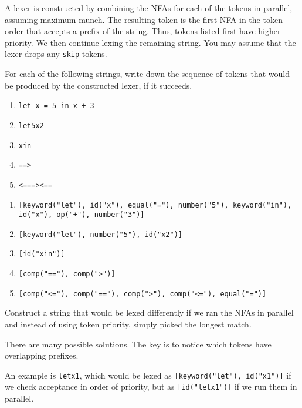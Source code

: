 A lexer is constructed by combining the NFAs for each of the tokens in parallel,
assuming maximum munch. The resulting token is the first NFA in the token order
that accepts a prefix of the string. Thus, tokens listed first have higher
priority. We then continue lexing the remaining string. You may assume that the
lexer drops any \texttt{skip} tokens.

\begin{exercise}{}

  For each of the following strings, write down the sequence of tokens that
  would be produced by the constructed lexer, if it succeeds. 

  \begin{enumerate}
    \item \texttt{let x = 5 in x + 3}
    \item \texttt{let5x2}
    \item \texttt{xin}
    \item \texttt{==>}
    \item \texttt{<===><==}
  \end{enumerate}

  \begin{solution}
    \begin{enumerate}
      \item \texttt{[keyword("let"), id("x"), equal("="), number("5"), keyword("in"), id("x"), op("+"), number("3")]}
      \item \texttt{[keyword("let"), number("5"), id("x2")]}
      \item \texttt{[id("xin")]}
      \item \texttt{[comp("=="), comp(">")]}
      \item \texttt{[comp("<="), comp("=="), comp(">"), comp("<="), equal("=")]}
    \end{enumerate}
  \end{solution}
  
\end{exercise}


\begin{exercise}{}
  Construct a string that would be lexed differently if we ran the NFAs in parallel
  and instead of using token priority, simply picked the longest match.

  \begin{solution}
    There are many possible solutions. The key is to notice which tokens have
    overlapping prefixes.

    An example is \texttt{letx1}, which would be lexed as
    \texttt{[keyword("let"), id("x1")]} if we check acceptance in order of
    priority, but as \texttt{[id("letx1")]} if we run them in parallel.
  \end{solution}
\end{exercise}
  
  
